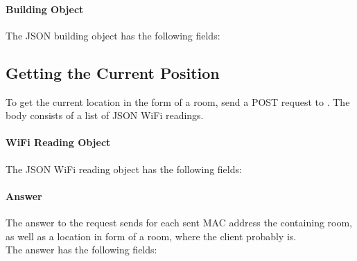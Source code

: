 \paragraph{Building Object}
The JSON building object has the following fields:
\begin{description}
\end{description}

\subsection{Getting the Current Position}
To get the current location in the form of a room, send a POST request to . The body consists of a list of JSON WiFi readings.

\paragraph{WiFi Reading Object}
The JSON WiFi reading object has the following fields:
\begin{description}
\end{description}

\paragraph{Answer}
The answer to the request sends for each sent MAC address the containing room, as well as a location in form of a room, where the client probably is.\\
The answer has the following fields:
\begin{description}
\end{description}


